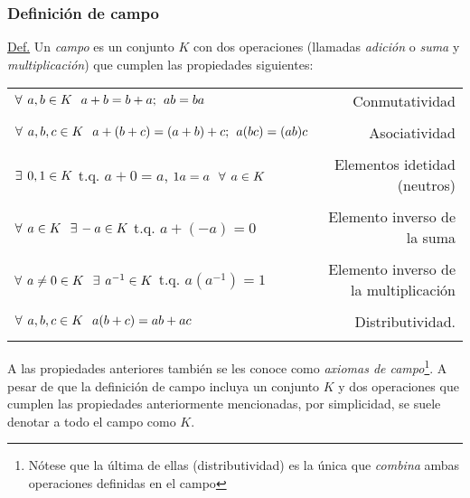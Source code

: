 \documentclass[12pt]{article}
\begin{document}
\subsubsection{Definición de campo} \label{Def:Campo}

\begin{tcolorbox}
\underline{Def.} Un \emph{campo} es un conjunto $K$ con dos operaciones (llamadas \emph{adición} o \emph{suma} y \emph{multiplicación}) que cumplen las propiedades siguientes:

\begin{center}
\begin{tabular}{lr}
    \\
    $\forall\hspace{1.5mm}a,b\in K\hspace{2.5mm} a+b=b+a;\hspace{1.5mm} ab = ba
    $ & Conmutatividad \\ \\
    $\forall\hspace{1.5mm}a,b,c\in K\hspace{2.5mm}a+(b+c)=(a+b)+c;\hspace{1.5mm}a(bc)=(ab)c$ & Asociatividad \\ \\
    $\exists\hspace{1.5mm} 0,1\in K$ t.q. $a+0=a$, $1a=a\hspace{2.5mm} \forall\hspace{1.5mm}a \in K$ & Elementos idetidad (neutros) \\ \\
    $\forall\hspace{1.5mm}a\in K\hspace{2.5mm}\exists\hspace{0.5mm}-a\in K$ t.q. $a + (-a) = 0$ & Elemento inverso de la suma \\ \\
    $\forall\hspace{1.5mm}a\neq0\in K \hspace{2.5mm} \exists\hspace{1.5mm}a^{-1}\in K$ t.q. $a(a^{-1})= 1$ & Elemento inverso de la multiplicación \\ \\
    $\forall\hspace{1.5mm}a,b,c\in K\hspace{2.5mm}a(b+c) = ab+ac$ & Distributividad.\\ \\
\end{tabular}
\end{center}

\noindent A las propiedades anteriores también se les conoce como \emph{axiomas de campo}\footnote{Nótese que la última de ellas (distributividad) es la única que \emph{combina} ambas operaciones definidas en el campo}. A pesar de que la definición de campo incluya un conjunto $K$ y dos operaciones que cumplen las propiedades anteriormente mencionadas, por simplicidad, se suele denotar a todo el campo como $K$.
\end{tcolorbox}
\end{document}
